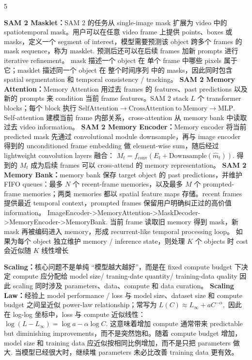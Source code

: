 \documentclass[a4paper, landscape]{article}
\begin{document}
\begin{multicols}{5}
\par \textbf{SAM 2 Masklet：}SAM 2 的任务从 single-image mask 扩展为 video 中的 spatiotemporal mask。用户可以在任意 video frame 上提供 points、boxes 或 masks，定义一个 segment of interest，模型需要预测该 object 跨多个 frames 的 mask sequence，称为
\(
\text{masklet}.
\)
预测后还可以在后续 frames 加新 prompts 进行 iterative refinement。
mask 描述一个 object 在 单个 frame 中哪些 pixels 属于它；masklet 描述同一个 object 在 整个时间序列 中的 masks，因此同时包含 spatial segmentation 和 temporal consistency / tracking。
\textbf{SAM 2 Memory Attention：}Memory Attention 用过去 frames 的 features、past predictions 以及新的 prompts 来 condition 当前 frame features。SAM 2 stack \(L\) 个 transformer blocks；每个 block 执行
\(
\mathrm{SelfAttention}
\rightarrow
\mathrm{CrossAttention\ to\ Memory}
\rightarrow
\mathrm{MLP}.
\)
Self-attention 建模当前 frame 内部关系，cross-attention 从 memory bank 中读取过去 video information。
\textbf{SAM 2 Memory Encoder：}Memory encoder 将当前 predicted mask 先通过 convolutional module downsample，再与 image encoder 得到的 unconditioned frame embedding 做 element-wise sum，随后经过 lightweight convolution layers 融合：
\(
M_t
=
f_{\mathrm{conv}}
\left(
E_t+
\mathrm{Downsample}(\hat m_t)
\right).
\)
得到的 \(M_t\) 成为后续 frames 可以 cross-attend 的 memory representation。
\textbf{SAM 2 Memory Bank：}memory bank 保存 target object 的 past predictions，并维护 FIFO queues：最多 \(N\) 个 recent-frame memories，以及最多 \(M\) 个 prompted-frame memories；两类 memories 都以 spatial feature maps 存储。recent frames 提供最近 temporal context，prompted frames 保留用户明确纠正过的高价值 information。
ImageEncoder->MemoryAttention->MaskDecoder->MemoryEncoder->MemoryBank.
当前 frame 读取旧 memory 得到 mask，新 mask 再被编码进入 memory，形成 recurrent-like temporal processing loop。
如果为每个 object 独立维护 memory / inference state，则处理 \(K\) 个 objects 时 cost 会近似随 \(K\) 线性增长

\par \textbf{Scaling：}核心问题不是单纯 ``模型越大越好''，而是在 fixed compute budget 下决定 compute 应分配给 model size/ traning-date quantity/ training-data quality
因此 scaling 同时涉及 parameters、data、compute 和 data curation。
\textbf{Scaling Law：}经验上 model performance / loss 与 model size、dataset size 和 compute budget 之间呈近似 power-law relationship；常写为
\(
L(C)\approx L_\infty + aC^{-\alpha},
\)
因此在 log-log 坐标中，loss 与 compute 近似线性：
\(
\log(L-L_\infty)
=
\log a-\alpha\log C.
\)
这意味着增加 compute 通常带来 predictable but diminishing improvements，而不是突然饱和。随着 compute budget 增加，model size 和 training data 应近似按相同比例增加，而不是只把 parameters 做大. 当模型已经很大时，继续堆 parameters 未必比改善 training data 更有效。



\end{multicols}
\end{document}
